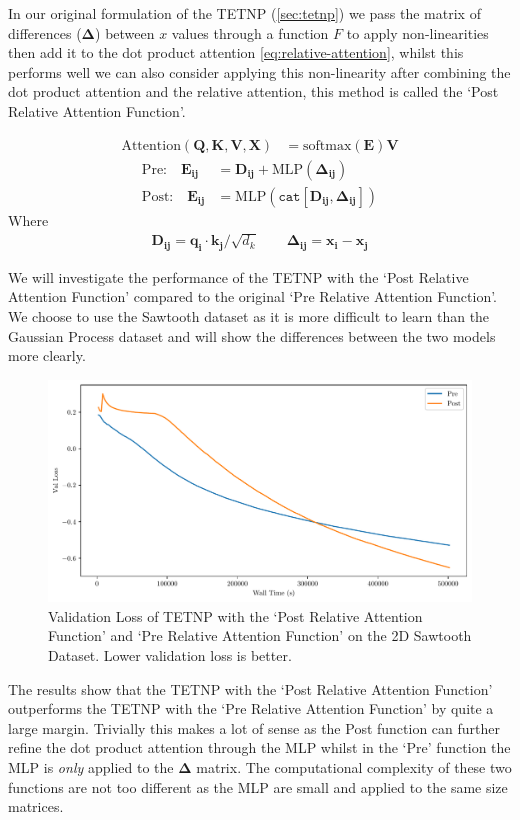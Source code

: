 \documentclass[../../main.tex]{subfiles}
\begin{document}
In our original formulation of the TETNP (\autoref{sec:tetnp}) we pass the matrix of differences ($\bm{\Delta}$) between $x$ values through a function $F$ to apply non-linearities then add it to the dot product attention \autoref{eq:relative-attention}, whilst this performs well we can also consider applying this non-linearity after combining the dot product attention and the relative attention, this method is called the `Post Relative Attention Function'. 

\begin{align}
	\text{Attention}(\bm{Q}, \bm{K}, \bm{V}, \bm{X}) &= \text{softmax}\left(\bm{E} \right) \bm{V}
\end{align}
\begin{align}
	\text{Pre:} \quad \bm{E_{ij}} &= \bm{D_{ij}}+ \text{MLP}(\bm{\Delta_{ij}})\\
    \text{Post:} \quad \bm{E_{ij}} &= \text{MLP}(\texttt{cat}[ \bm{D_{ij}}, \bm{\Delta_{ij}}])
\end{align}
Where 
\begin{align}
     \bm{D_{ij}} = \bm{q_i} \cdot \bm{k_j}  /\sqrt{d_k} \quad \quad    \bm{\Delta_{ij}} = \bm{x_i} - \bm{x_j}
\end{align}


We will investigate the performance of the TETNP with the `Post Relative Attention Function' compared to the original `Pre Relative Attention Function'. We choose to use the Sawtooth dataset as it is more difficult to learn than the Gaussian Process dataset and will show the differences between the two models more clearly. 


\begin{figure}[H]
    \centering
    \includegraphics[width=0.6\linewidth]{./fig/post-pre-kernel.pdf}
    \caption{Validation Loss of TETNP with the `Post Relative Attention Function' and `Pre Relative Attention Function' on the 2D Sawtooth Dataset. Lower validation loss is better.}
    \label{fig:post-pre-kernel}
\end{figure}


The results show that the TETNP with the `Post Relative Attention Function' outperforms the TETNP with the `Pre Relative Attention Function' by quite a large margin. Trivially this makes a lot of sense as the Post function can further refine the dot product attention through the MLP whilst in the `Pre' function the MLP is \emph{only} applied to the $\bm{\Delta}$ matrix. The computational complexity of these two functions are not too different as the MLP are small and applied to the same size matrices. 
\end{document}
